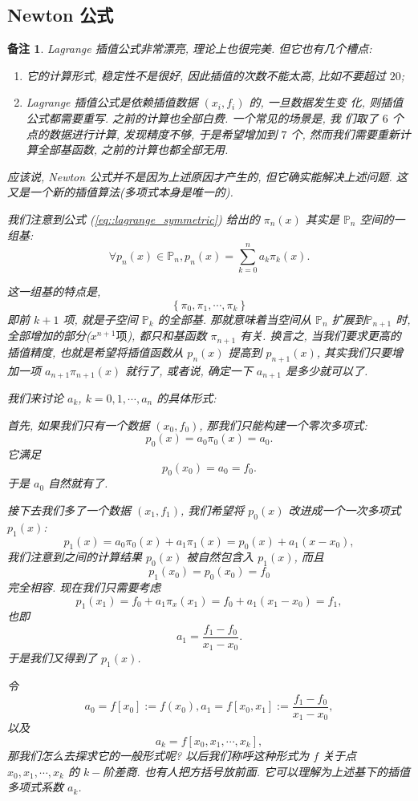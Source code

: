 \documentclass[a4paper]{ctexart}
\newtheorem{remark}{备注}
\numberwithin{theorem}{section}
\numberwithin{equation}{section}
\numberwithin{figure}{section}
\numberwithin{remark}{section}
\begin{document}
\subsection{Newton 公式}

\begin{remark}
Lagrange 插值公式非常漂亮, 理论上也很完美. 但它也有几个槽点:

\begin{enumerate}
\item 它的计算形式, 稳定性不是很好, 因此插值的次数不能太高, 比如不要超过 $20$;
\item Lagrange 插值公式是依赖插值数据 $(x_i, f_i)$ 的, 一旦数据发生变
  化, 则插值公式都需要重写. 之前的计算也全部白费. 一个常见的场景是, 我
  们取了 $6$ 个点的数据进行计算, 发现精度不够, 于是希望增加到 $7$ 个,
  然而我们需要重新计算全部基函数, 之前的计算也都全部无用. 
\end{enumerate}

应该说, Newton 公式并不是因为上述原因才产生的, 但它确实能解决上述问题.
这又是一个新的插值算法(多项式本身是唯一的).

我们注意到公式 (\ref{eq::lagrange_symmetric}) 给出的 $\pi_n(x)$ 其实是 $\mathbb{P}_n$ 空间的一组基: 
$$
\forall p_n(x) \in \mathbb{P}_n, p_n(x) = \sum_{k = 0}^n a_k \pi_k(x).
$$

这一组基的特点是,
$$
\left\{\pi_0, \pi_1, \cdots, \pi_k\right\}
$$
即前 $k + 1$ 项, 就是子空间 $\mathbb{P}_k$ 的全部基. 那就意味着当空间从
$\mathbb{P}_n$ 扩展到$\mathbb{P}_{n + 1}$ 时, 全部增加的部分($x^{n + 1}项$),
都只和基函数 $\pi_{n + 1}$ 有关. 换言之, 当我们要求更高的插值精度, 也就是希望将插值函数从
$p_n(x)$ 提高到 $p_{n + 1}(x)$, 其实我们只要增加一项
$a_{n + 1}\pi_{n + 1}(x)$ 就行了, 或者说, 确定一下 $a_{n + 1}$ 是多少就可以了.

我们来讨论 $a_k$, $k = 0, 1, \cdots, a_n$
的具体形式:

首先, 如果我们只有一个数据 $(x_0, f_0)$, 那我们只能构建一个零次多项式:
$$
p_0(x) = a_0 \pi_0(x) = a_0. 
$$
它满足
$$
p_0(x_0) = a_0 = f_0.
$$
于是 $a_0$ 自然就有了.

接下去我们多了一个数据 $(x_1, f_1)$, 我们希望将 $p_0(x)$ 改进成一个一次多项式 $p_1(x)$:
$$
p_1(x) = a_0 \pi_0(x) + a_1 \pi_1(x) = p_0(x) + a_1 (x - x_0),
$$
我们注意到之间的计算结果 $p_0(x)$ 被自然包含入 $p_1(x)$, 而且
$$
p_1(x_0) = p_0(x_0) = f_0
$$
完全相容. 现在我们只需要考虑
$$
p_1(x_1) = f_0 + a_1 \pi_x(x_1) = f_0 + a_1 (x_1 - x_0) = f_1,
$$
也即
$$
a_1 = \frac{f_1 - f_0}{x_1 - x_0}.
$$
于是我们又得到了 $p_1(x)$.

令
$$
a_0 = f[x_0] := f(x_0), a_1 = f[x_0, x_1] := \frac{f_1 - f_0}{x_1 - x_0},
$$
以及
$$
a_k = f[x_0, x_1, \cdots, x_k],
$$
那我们怎么去探求它的一般形式呢? 以后我们称呼这种形式为 $f$ 关于点 $x_0, x_1, \cdots, x_k$
的 $k-$阶差商. 也有人把方括号放前面. 它可以理解为上述基下的插值多项式系数 $a_k$.
\end{remark}
\end{document}
